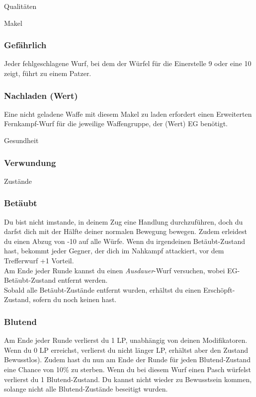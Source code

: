 \documentclass{article}
\begin{document}
\begin{multicols*}{3}
\begin{slsframe}{Qualitäten}
    \end{slsframe}

    \begin{slsframe}{Makel}
        \subsubsection*{Gefährlich}
        Jeder fehlgeschlagene Wurf, bei dem der Würfel für die Einerstelle 9 oder eine 10 zeigt, führt zu einem Patzer.

        \subsubsection*{Nachladen (Wert)}
        Eine nicht geladene Waffe mit diesem Makel zu laden erfordert einen Erweiterten Fernkampf-Wurf für die jeweilige Waffengruppe, der (Wert) EG benötigt.

    \end{slsframe}

    \begin{slsframe}{Gesundheit}
        \subsubsection*{Verwundung}

    \end{slsframe}

    \begin{slsframe}{Zustände}
        \subsubsection*{Betäubt}
        Du bist nicht imstande, in deinem Zug eine Handlung durchzuführen, doch du darfst dich mit der Hälfte deiner normalen Bewegung bewegen. Zudem erleidest du einen Abzug von -10 auf alle Würfe. Wenn du irgendeinen Betäubt-Zustand hast, bekommt jeder Gegner, der dich im Nahkampf attackiert, vor dem Trefferwurf +1 Vorteil.\\
        
        Am Ende jeder Runde kannst du einen \textit{Ausdauer}-Wurf versuchen, wobei EG-Betäubt-Zustand entfernt werden.\\
        
        Sobald alle Betäubt-Zustände entfernt wurden, erhältst du einen Erschöpft-Zustand, sofern du noch keinen hast.

        \subsubsection*{Blutend}
        Am Ende jeder Runde verlierst du 1 LP, unabhängig von deinen Modifikatoren. Wenn du 0 LP erreichst, verlierst du nicht länger LP, erhältst aber den Zustand Bewusstlos). Zudem hast du nun am Ende der Runde für jeden Blutend-Zustand eine Chance von 10\% zu sterben. Wenn du bei diesem Wurf einen Pasch würfelst verlierst du 1 Blutend-Zustand. Du kannst nicht wieder zu Bewusstsein kommen, solange nicht alle Blutend-Zustände beseitigt wurden.\\


\end{slsframe}
\end{multicols*}
\end{document}
